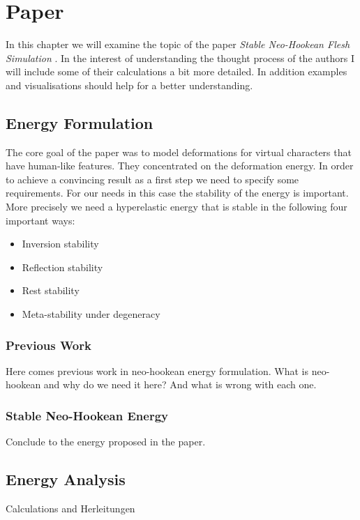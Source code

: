 \chapter{Paper} \label{c:Paper}
In this chapter we will examine the topic of the paper \textit{Stable Neo-Hookean Flesh Simulation} \cite{Smith:2018:SNF:3191713.3180491}. In the interest of understanding the thought process of the authors I will include some of their calculations a bit more detailed. In addition examples and visualisations should help for a better understanding. 

\section{Energy Formulation}
The core goal of the paper was to model deformations for virtual characters that have human-like features. They concentrated on the deformation energy. In order to achieve a convincing result as a first step we need to specify some requirements. For our needs in this case the stability of the energy is important. More precisely we need a hyperelastic energy that is stable in the following four important ways:

\begin{itemize}
\item Inversion stability
\item Reflection stability
\item Rest stability
\item Meta-stability under degeneracy
\end{itemize}


\subsection{Previous Work}
Here comes previous work in neo-hookean energy formulation. What is neo-hookean and why do we need it here?
And what is wrong with each one.

\subsection{Stable Neo-Hookean Energy}
Conclude to the energy proposed in the paper.

\section{Energy Analysis}
Calculations and Herleitungen

